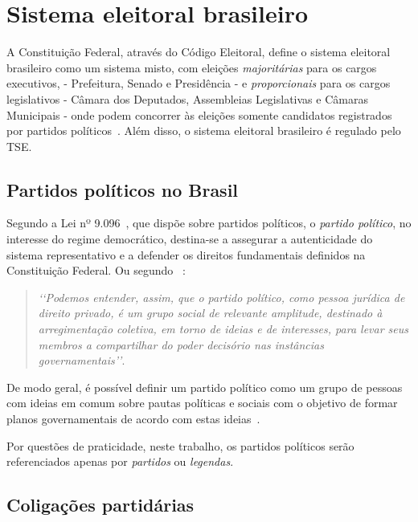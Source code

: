 \section{Sistema eleitoral brasileiro}

A Constituição Federal, através do Código Eleitoral, define o sistema eleitoral brasileiro como um sistema misto, com eleições \emph{majoritárias} para os cargos executivos, - Prefeitura, Senado e Presidência - e \emph{proporcionais} para os cargos legislativos - Câmara dos Deputados, Assembleias Legislativas e Câmaras Municipais - onde podem concorrer às eleições somente candidatos registrados por partidos políticos~\cite{brasil1965lei4737}. Além disso, o sistema eleitoral brasileiro é regulado pelo \gls{TSE}.

\subsection{Partidos políticos no Brasil}
\label{conceitos__partidos-brasil}
    
Segundo a  Lei nº 9.096~\cite{brasil1995lei9096}, que dispõe sobre partidos políticos, o \emph{partido político}, no interesse do regime democrático, destina-se a assegurar a autenticidade do sistema representativo e a defender os direitos fundamentais definidos na Constituição Federal. Ou segundo ~\cite{michels2006direito}:

\begin{quotation}
    \emph{‘‘Podemos entender, assim, que o partido político, como pessoa jurídica de direito privado, é um grupo social de relevante amplitude, destinado à arregimentação coletiva, em torno de ideias e de interesses, para levar seus membros a compartilhar do poder decisório nas instâncias governamentais’’}.
\end{quotation}

De modo geral, é possível definir um partido político como um grupo de pessoas com ideias em comum sobre pautas políticas e sociais com o objetivo de formar planos governamentais de acordo com estas ideias~\cite{garibaldi2017partidos}.

Por questões de praticidade, neste trabalho, os partidos políticos serão referenciados apenas por \emph{partidos} ou \emph{legendas}. 


\subsection{Coligações partidárias}
\label{conceitos__coligacoes}

